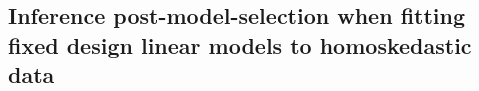 \documentclass[preprint]{imsart}
\newcommand{\R}{{\mathbb R}}
\numberwithin{equation}{section}
\begin{document}
%
%
%



\subsection{Inference post-model-selection when fitting fixed design linear models to homoskedastic data}\label{sec:homlinmods}
\end{document}
